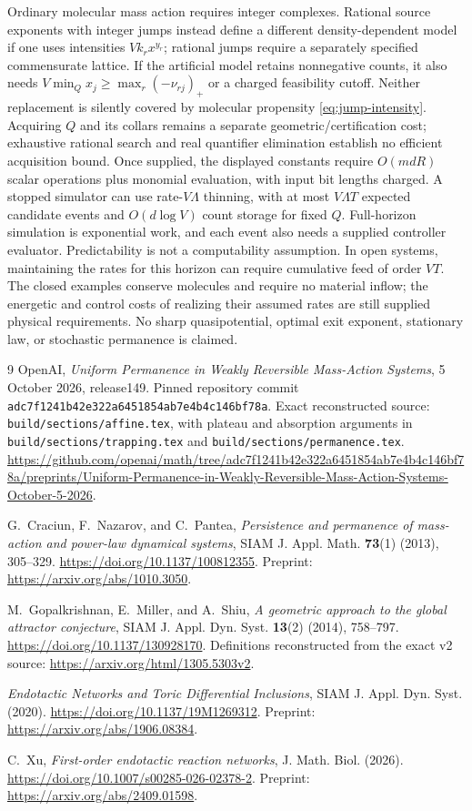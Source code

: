 \documentclass[11pt]{article}
\theoremstyle{definition}
\theoremstyle{remark}
\numberwithin{equation}{section}
\begin{document}
Ordinary molecular mass action requires integer complexes. Rational
source exponents with integer jumps instead define a different
density-dependent model if one uses intensities $Vk_rx^{y_r}$;
rational jumps require a separately specified commensurate lattice.
If the artificial model retains nonnegative counts, it also needs
$V\min_Qx_j\ge\max_r(-\nu_{rj})_+$ or a charged feasibility cutoff.
Neither replacement is silently covered by molecular propensity
\eqref{eq:jump-intensity}. Acquiring $Q$ and its collars remains a
separate geometric/certification cost; exhaustive rational search and
real quantifier elimination establish no efficient acquisition bound.
Once supplied, the displayed constants require $O(mdR)$ scalar
operations plus monomial evaluation, with input bit lengths charged.
A stopped simulator can use rate-$V\Lambda$ thinning, with at most
$V\Lambda T$ expected candidate events and $O(d\log V)$ count storage
for fixed $Q$. Full-horizon simulation is exponential work, and each
event also needs a supplied controller evaluator. Predictability is
not a computability assumption. In open systems, maintaining the
rates for this horizon can require cumulative feed of order $VT$.
The closed examples conserve molecules and require no material inflow;
the energetic and control costs of realizing their assumed rates
are still supplied physical requirements. No sharp quasipotential,
optimal exit exponent, stationary law, or stochastic permanence is
claimed.

\begin{thebibliography}{9}
OpenAI, \emph{Uniform Permanence in Weakly Reversible
Mass-Action Systems}, 5 October 2026, release149.
Pinned repository commit
\texttt{adc7f1241b42e322a6451854ab7e4b4c146bf78a}.
Exact reconstructed source: \texttt{build/sections/affine.tex},
with plateau and absorption arguments in
\texttt{build/sections/trapping.tex} and
\texttt{build/sections/permanence.tex}.
\url{https://github.com/openai/math/tree/adc7f1241b42e322a6451854ab7e4b4c146bf78a/preprints/Uniform-Permanence-in-Weakly-Reversible-Mass-Action-Systems-October-5-2026}.

G.~Craciun, F.~Nazarov, and C.~Pantea,
\emph{Persistence and permanence of mass-action and
power-law dynamical systems}, SIAM J. Appl. Math.
\textbf{73}(1) (2013), 305--329.
\url{https://doi.org/10.1137/100812355}.
Preprint: \url{https://arxiv.org/abs/1010.3050}.

M.~Gopalkrishnan, E.~Miller, and A.~Shiu,
\emph{A geometric approach to the global attractor
conjecture}, SIAM J. Appl. Dyn. Syst. \textbf{13}(2)
(2014), 758--797.
\url{https://doi.org/10.1137/130928170}.
Definitions reconstructed from the exact v2 source:
\url{https://arxiv.org/html/1305.5303v2}.

\emph{Endotactic Networks and Toric Differential Inclusions},
SIAM J. Appl. Dyn. Syst. (2020).
\url{https://doi.org/10.1137/19M1269312}.
Preprint: \url{https://arxiv.org/abs/1906.08384}.

C.~Xu, \emph{First-order endotactic reaction networks},
J. Math. Biol. (2026).
\url{https://doi.org/10.1007/s00285-026-02378-2}.
Preprint: \url{https://arxiv.org/abs/2409.01598}.
\end{thebibliography}
\end{document}
